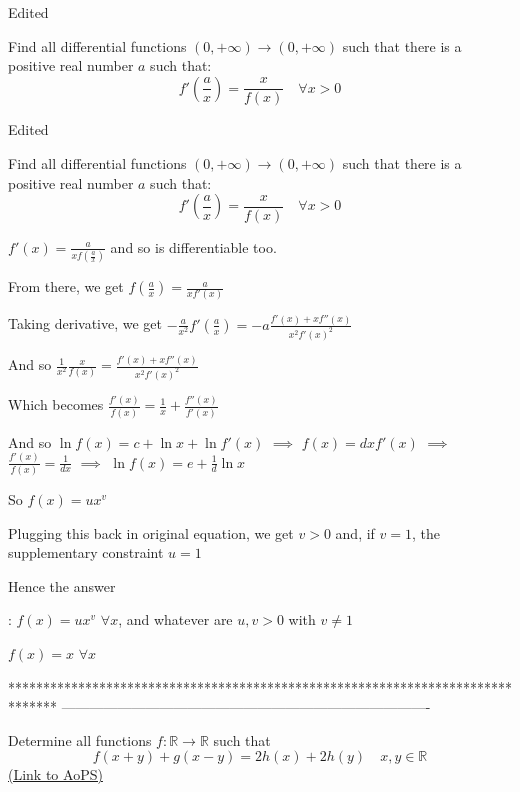 \begin{solution}
	Edited
 
Find all differential functions $(0, +\infty) \to (0, +\infty)$  such that there is a positive real number $a$ such that:
\[f '\left (\frac{a }{ x}\right) = \frac{x }{ f (x)}\quad  \forall x> 0\]
\end{solution}



\begin{solution}
	\begin{tcolorbox}Edited
 
Find all differential functions $(0, +\infty) \to (0, +\infty)$  such that there is a positive real number $a$ such that:
\[f '\left (\frac{a }{ x}\right) = \frac{x }{ f (x)}\quad  \forall x> 0\]\end{tcolorbox}
$f'(x)=\frac a{xf(\frac ax)}$ and so is differentiable too.

From there, we get $f(\frac ax)=\frac a{xf'(x)}$

Taking derivative, we get $-\frac a{x^2}f'(\frac ax)=-a\frac{f'(x)+xf''(x)}{x^2f'(x)^2}$

And so $\frac 1{x^2}\frac x{f(x)}=\frac{f'(x)+xf''(x)}{x^2f'(x)^2}$

Which becomes $\frac {f'(x)}{f(x)}=\frac{1}{x}+\frac{f''(x)}{f'(x)}$

And so $\ln f(x)=c+\ln x+\ln f'(x)$ $\implies$ $f(x)=dxf'(x)$ $\implies$ $\frac{f'(x)}{f(x)}=\frac 1{dx}$ $\implies$ $\ln f(x)=e+\frac 1d\ln x$

So $f(x)=ux^v$

Plugging this back in original equation, we get $v>0$ and, if $v=1$, the supplementary constraint $u=1$

\begin{bolded}Hence the answer\end{bolded} :
$\boxed{f(x)=ux^v}$ $\forall x$, and whatever are $u,v>0$ with $v\ne 1$

$\boxed{f(x)=x}$ $\forall x$
\end{solution}
*******************************************************************************
-------------------------------------------------------------------------------

\begin{problem}
	Determine all  functions $f: \mathbb {R}\to\mathbb {R}$ such that
\[f(x+y)+g(x-y)=2h(x)+2h(y) \quad x,y\in\mathbb R\]
	\flushright \href{https://artofproblemsolving.com/community/c6h566572}{(Link to AoPS)}
\end{problem}



